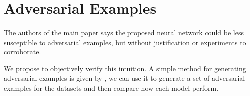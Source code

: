 \section{Adversarial Examples}
\paragraph{}
The authors of the main paper says the proposed neural network could be less susceptible to adversarial examples, but without justification or experiments to corroborate.

We propose to objectively verify this intuition. A simple method for generating adversarial examples is given by \cite{goodfellow2014explaining}, we can use it to generate a set of adversarial examples for the datasets and then compare how each model perform.

